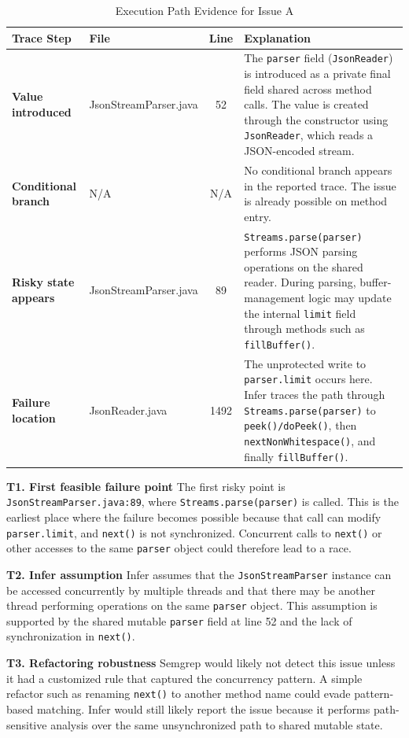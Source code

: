 \documentclass[11pt]{article}
\begin{document}
\begin{table}[H]
\centering
\caption{Execution Path Evidence for Issue A}
\begin{tabularx}{\textwidth}{>{\bfseries}l l c X}
\toprule
Trace Step & File & Line & Explanation \\
\midrule
Value introduced & JsonStreamParser.java & 52 & The \texttt{parser} field (\texttt{JsonReader}) is introduced as a private final field shared across method calls. The value is created through the constructor using \texttt{JsonReader}, which reads a JSON-encoded stream. \\
Conditional branch & N/A & N/A & No conditional branch appears in the reported trace. The issue is already possible on method entry. \\
Risky state appears & JsonStreamParser.java & 89 & \texttt{Streams.parse(parser)} performs JSON parsing operations on the shared reader. During parsing, buffer-management logic may update the internal \texttt{limit} field through methods such as \texttt{fillBuffer()}. \\
Failure location & JsonReader.java & 1492 & The unprotected write to \texttt{parser.limit} occurs here. Infer traces the path through \texttt{Streams.parse(parser)} to \texttt{peek()/doPeek()}, then \texttt{nextNonWhitespace()}, and finally \texttt{fillBuffer()}. \\
\bottomrule
\end{tabularx}
\end{table}

\textbf{T1. First feasible failure point} The first risky point is \texttt{JsonStreamParser.java:89}, where \texttt{Streams.parse(parser)} is called. This is the earliest place where the failure becomes possible because that call can modify \texttt{parser.limit}, and \texttt{next()} is not synchronized. Concurrent calls to \texttt{next()} or other accesses to the same \texttt{parser} object could therefore lead to a race.

\textbf{T2. Infer assumption} Infer assumes that the \texttt{JsonStreamParser} instance can be accessed concurrently by multiple threads and that there may be another thread performing operations on the same \texttt{parser} object. This assumption is supported by the shared mutable \texttt{parser} field at line 52 and the lack of synchronization in \texttt{next()}.

\textbf{T3. Refactoring robustness} Semgrep would likely not detect this issue unless it had a customized rule that captured the concurrency pattern. A simple refactor such as renaming \texttt{next()} to another method name could evade pattern-based matching. Infer would still likely report the issue because it performs path-sensitive analysis over the same unsynchronized path to shared mutable state.
\end{document}
